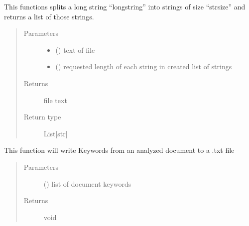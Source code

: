 \documentclass[letterpaper,10pt,english]{sphinxmanual}
\begin{document}

\begin{fulllineitems}
\label{\detokenize{functionsv1:common_functions.longstringtostringlist}}
This functions splits a long string “longstring” into strings of size “strsize” and returns a list of those strings.
\begin{quote}\begin{description}
\item[{Parameters}] \leavevmode\begin{itemize}
\item {} 
 () \textendash{} text of file

\item {} 
 () \textendash{} requested length of each string in created list of strings

\end{itemize}

\item[{Returns}] \leavevmode
file text

\item[{Return type}] \leavevmode
List{[}str{]}

\end{description}\end{quote}

\end{fulllineitems}


\begin{fulllineitems}
\label{\detokenize{functionsv1:common_functions.outputkeywordtotext}}
This function will write Keywords from an analyzed document to a .txt file
\begin{quote}\begin{description}
\item[{Parameters}] \leavevmode
{} ({\hyperref[\detokenize{KeywordList:module-KeywordList}]{}}) \textendash{} list of document keywords

\item[{Returns}] \leavevmode
void

\end{description}\end{quote}

\end{fulllineitems}
\end{document}
